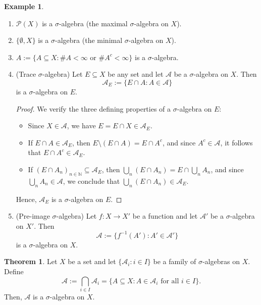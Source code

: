 \documentclass[12pt]{article}
\theoremstyle{definition}
\newtheorem{theorem}{Theorem}[section]
\newtheorem{example}{Example}[section]
\begin{document}
\medskip
\begin{example}\leavevmode\
\begin{enumerate}
    \item $\mathcal{P}(X)$ is a $\sigma$-algebra (the maximal $\sigma$-algebra on $X$).
    
    \item $\{\emptyset, X\}$ is a $\sigma$-algebra (the minimal $\sigma$-algebra on $X$).
    
    \item $A := \{A \subseteq X : \#A < \infty \text{ or } \#A^c < \infty\}$ is a $\sigma$-algebra.

    \item (Trace $\sigma$-algebra) Let $E \subseteq X$ be any set and let $\mathcal{A}$ be a $\sigma$-algebra on $X$. Then
    \[
    \mathcal{A}_E := \{E \cap A : A \in \mathcal{A}\}
    \]
    is a $\sigma$-algebra on $E$.

   \begin{proof}
We verify the three defining properties of a $\sigma$-algebra on $E$:

\begin{itemize}
    \item Since $X \in \mathcal{A}$, we have \( E = E \cap X \in \mathcal{A}_E \).
    \item If \( E \cap A \in \mathcal{A}_E \), then \( E \setminus (E \cap A) = E \cap A^c \), and since \( A^c \in \mathcal{A} \), it follows that \( E \cap A^c \in \mathcal{A}_E \).
    \item If \( (E \cap A_n)_{n \in \mathbb{N}} \subseteq \mathcal{A}_E \), then \( \bigcup_{n} (E \cap A_n) = E \cap \bigcup_{n} A_n \), and since \( \bigcup_n A_n \in \mathcal{A} \), we conclude that \( \bigcup_n (E \cap A_n) \in \mathcal{A}_E \).
\end{itemize}
Hence, $\mathcal{A}_E$ is a $\sigma$-algebra on $E$.
\end{proof}

    \item (Pre-image $\sigma$-algebra) Let $f : X \to X'$ be a function and let $\mathcal{A}'$ be a $\sigma$-algebra on $X'$. Then
    \[
    \mathcal{A} := \{f^{-1}(A') : A' \in \mathcal{A}'\}
    \]
    is a $\sigma$-algebra on $X$.
\end{enumerate}
\end{example}


\medskip
\begin{theorem}
Let $X$ be a set and let $\{\mathcal{A}_i : i \in I\}$ be a family of $\sigma$-algebras on $X$. Define
\[
\mathcal{A} := \bigcap_{i \in I} \mathcal{A}_i = \{ A \subseteq X : A \in \mathcal{A}_i \text{ for all } i \in I \}.
\]
Then, $\mathcal{A}$ is a $\sigma$-algebra on $X$.
\end{theorem}
\end{document}
